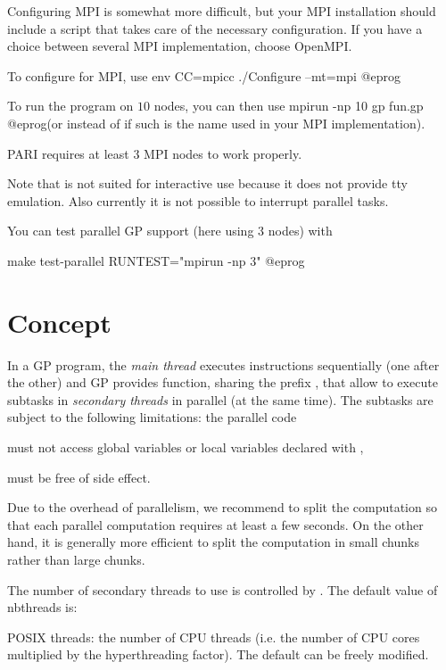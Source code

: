 Configuring MPI is somewhat more difficult, but your MPI installation should
include a script  that takes care of the necessary configuration.
If you have a choice between several MPI implementation, choose OpenMPI.

To configure for MPI, use
\bprog
env CC=mpicc ./Configure --mt=mpi
@eprog

To run the program  on $10$ nodes, you can then use
\bprog
  mpirun -np 10 gp fun.gp
@eprog\noindent (or  instead of  if such is
the name used in your MPI implementation).

PARI requires at least $3$ MPI nodes to work properly.

Note that  is not suited for interactive use because it
does not provide tty emulation. Also currently it is not possible to
interrupt parallel tasks.

You can test parallel GP support (here using 3 nodes) with

\bprog
make test-parallel RUNTEST="mpirun -np 3"
@eprog

\section{Concept}

In a GP program, the \emph{main thread} executes instructions sequentially
(one after the other) and GP provides function, sharing the prefix ,
that allow to execute subtasks in \emph{secondary threads} in parallel (at
the same time). The subtasks are subject to the following limitations: the
parallel code

\item must not access global variables or local variables declared with
  ,

\item must be free of side effect.

Due to the overhead of parallelism, we recommend to split the computation so
that each parallel computation requires at least a few seconds. On the other
hand, it is generally more efficient to split the computation in small chunks
rather than large chunks.


The number of secondary threads to use is controlled by
. The default value of nbthreads is:

\item POSIX threads: the number of CPU threads (i.e. the number of CPU cores
multiplied by the hyperthreading factor).
The default can be freely modified.

